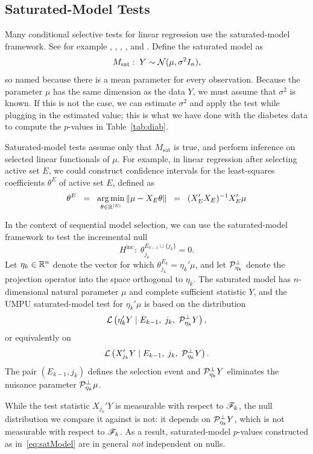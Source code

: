 \documentclass{article}
\begin{document}
\subsection{Saturated-Model Tests}
Many conditional selective tests for linear regression use the saturated-model framework. See for example \citet{lockhart2014significance}, \citet{taylor2013tests}, \citet{taylor2014exact}, \citet{lee2013exact}, and \citet{loftus2014significance}. Define the saturated model as
\[
M_{\text{sat}}:\; Y \sim \mathcal{N}(\mu, \sigma^2I_n),
\]
so named because there is a mean parameter for every observation. Because the parameter $\mu$ has the same dimension as the data $Y$, we must assume that $\sigma^2$ is known. If this is not the case, we can estimate $\sigma^2$ and apply the test while plugging in the estimated value; this is what we have done with the diabetes data to compute the $p$-values in Table~\ref{tab:diab}.

Saturated-model tests assume only that $M_{\text{sat}}$ is true, and perform inference on selected linear functionals of $\mu$. For example, in linear regression after selecting active set $E$, we could construct confidence intervals for the least-squares coefficients $\theta^E$ of active set $E$, defined as
\[
\theta^E \;\;=\;\; \operatorname*{arg\,min}_{\theta\in\mathbb{R}^{|E|}} \|\mu - X_E\theta\| \;\;=\;\; (X_E'X_E)^{-1}X_E'\mu
\]

In the context of sequential model selection, we can use the saturated-model framework to test the incremental null 
\[
H^{\text{inc}}:\; \theta_{j_k}^{E_{k-1}\cup \{j_k\}} = 0.
\]
Let $\eta_k\in \mathbb{R}^n$ denote the vector for which $\theta_{j_k}^{E_k} = \eta_k'\mu$, and let $\mathcal{P}_{\eta_k}^\perp$ denote the projection operator into the space orthogonal to $\eta_k$. The saturated model has $n$-dimensional natural parameter $\mu$ and complete sufficient statistic $Y$, and the UMPU saturated-model test for $\eta_k'\mu$ is based on the distribution
\begin{equation}\label{eq:satModel}
\mathcal{L}\left( \eta_k'Y \mid E_{k-1}, \;j_k, \;\mathcal{P}_{\eta_k}^\perp Y \right),
\end{equation}
or equivalently on
\begin{equation}\label{eq:satModelEquiv}
\mathcal{L}\left( X_{j_k}'Y \mid E_{k-1}, \;j_k, \;\mathcal{P}_{\eta_k}^\perp Y \right).
\end{equation}
The pair $(E_{k-1}, j_k)$ defines the selection event and $\mathcal{P}_{\eta_k}^\perp Y$ eliminates the nuisance parameter $\mathcal{P}_{\eta_k}^\perp \mu$.

While the test statistic $X_{j_k}'Y$ is measurable with respect to $\mathscr{F}_k$, the null distribution we compare it against is not: it depends on $\mathcal{P}_{\eta_k}^\perp Y$, which is not measurable with respect to $\mathscr{F}_k$. As a result, saturated-model $p$-values constructed as in~\eqref{eq:satModel} are in general {\em not} independent on nulls.
\end{document}
